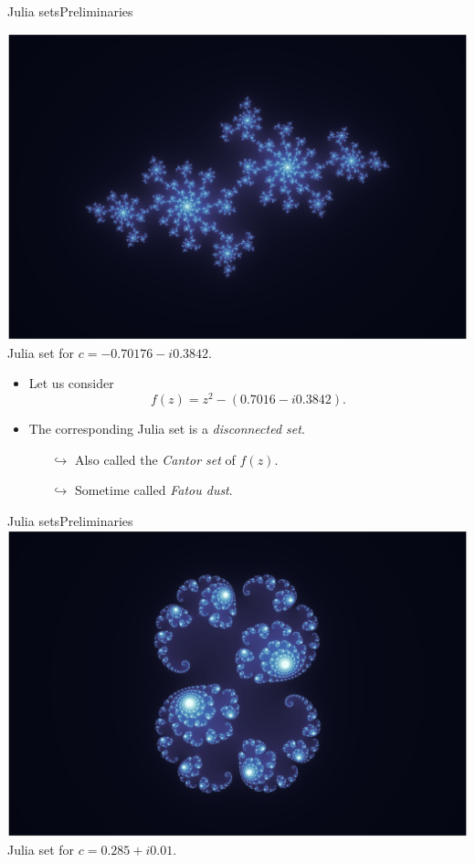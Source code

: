 \documentclass[usenames,dvipsnames,svgnames,10pt,aspectratio=169]{beamer}
\begin{document}
\begin{frame}[t, c]{Julia sets}{Preliminaries}
	\begin{minipage}{.48\textwidth}
		\centering
		\includegraphics[width=\columnwidth]{Julia_set_2} \\
		\medskip
		Julia set for $c = - 0.70176 - i0.3842$.
	\end{minipage}%
	\hfill
	\begin{minipage}{.48\textwidth}
		\begin{itemize}
		\item Let us consider
		$$f(z) = z^2 - (0.7016 - i0.3842).$$

		\medskip

		\item The corresponding Julia set is a \emph{disconnected set}.
		\begin{itemize}
			\item[$\hookrightarrow$] Also called the \emph{Cantor set} of $f(z)$.
			\item[$\hookrightarrow$] Sometime called \emph{Fatou dust}.
		\end{itemize}
	\end{itemize}
	\end{minipage}

	\vspace{1cm}
\end{frame}

\begin{frame}[t, c]{Julia sets}{Preliminaries}
	\centering
	\includegraphics[width=.6\textwidth]{Julia_set_3} \\
	\medskip
	Julia set for $c = 0.285 + i0.01$.

	\vspace{1cm}
\end{frame}
\end{document}
